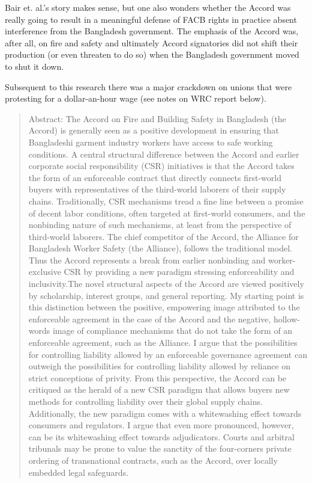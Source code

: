 \documentclass[
  12pt,
]{article}
\begin{document}
Bair et. al.'s story makes sense, but one also wonders whether the
Accord was really going to result in a meaningful defense of FACB rights
in practice absent interference from the Bangladesh government. The
emphasis of the Accord was, after all, on fire and safety and ultimately
Accord signatories did not shift their production (or even threaten to
do so) when the Bangladesh government moved to shut it down.

Subsequent to this research there was a major crackdown on unions that
were protesting for a dollar-an-hour wage (see notes on WRC report
below).

\bigbreak


\begin{quote}
Abstract: 
The Accord on Fire and Building Safety in Bangladesh (the Accord) is generally seen as a positive development in ensuring that Bangladeshi garment industry workers have access to safe working conditions. A central structural difference between the Accord and earlier corporate social responsibility (CSR) initiatives is that the Accord takes the form of an enforceable contract that directly connects first-world buyers with representatives of the third-world laborers of their supply chains. Traditionally, CSR mechanisms tread a fine line between a promise of decent labor conditions, often targeted at first-world consumers, and the nonbinding nature of such mechanisms, at least from the perspective of third-world laborers. The chief competitor of the Accord, the Alliance for Bangladesh Worker Safety (the Alliance), follows the traditional model. Thus the Accord represents a break from earlier nonbinding and worker-exclusive CSR by providing a new paradigm stressing enforceability and inclusivity.The novel structural aspects of the Accord are viewed positively by scholarship, interest groups, and general reporting. My starting point is this distinction between the positive, empowering image attributed to the enforceable agreement in the case of the Accord and the negative, hollow-words image of compliance mechanisms that do not take the form of an enforceable agreement, such as the Alliance. I argue that the possibilities for controlling liability allowed by an enforceable governance agreement can outweigh the possibilities for controlling liability allowed by reliance on strict conceptions of privity. From this perspective, the Accord can be critiqued as the herald of a new CSR paradigm that allows buyers new methods for controlling liability over their global supply chains. Additionally, the new paradigm comes with a whitewashing effect towards consumers and regulators. I argue that even more pronounced, however, can be its whitewashing effect towards adjudicators. Courts and arbitral tribunals may be prone to value the sanctity of the four-corners private ordering of transnational contracts, such as the Accord, over locally embedded legal safeguards.
\end{quote}
\end{document}
